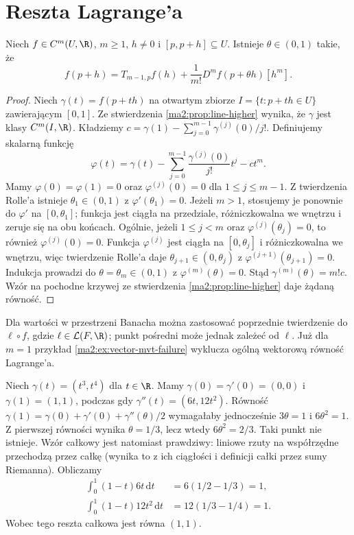 \section{Reszta Lagrange'a}
\begin{twierdzenie}
\label{ma2:thm:taylor-lagrange}
Niech $f\in C^m(U,\R)$, $m\ge1$, $h\ne0$ i
$[p,p+h]\subseteq U$. Istnieje $\theta\in(0,1)$ takie, że
\[
 f(p+h)=T_{m-1,p}f(h)+\frac{1}{m!}
                         D^mf(p+\theta h)[h^m].
\]
\end{twierdzenie}
\begin{proof}
Niech $\gamma(t)=f(p+th)$ na otwartym zbiorze
$I=\{t:p+th\in U\}$ zawierającym $[0,1]$.
Ze stwierdzenia \ref{ma2:prop:line-higher} wynika,
że $\gamma$ jest klasy $C^m(I,\R)$. Kładziemy
$c=\gamma(1)-\sum_{j=0}^{m-1}\gamma^{(j)}(0)/j!$.
Definiujemy skalarną funkcję
\[
 \varphi(t)=\gamma(t)-\sum_{j=0}^{m-1}
             \frac{\gamma^{(j)}(0)}{j!}t^j-ct^m.
\]
Mamy $\varphi(0)=\varphi(1)=0$ oraz
$\varphi^{(j)}(0)=0$ dla $1\le j\le m-1$.
Z twierdzenia Rolle'a istnieje $\theta_1\in(0,1)$
z $\varphi'(\theta_1)=0$.
Jeżeli $m>1$, stosujemy je ponownie do $\varphi'$
na $[0,\theta_1]$; funkcja jest ciągła na przedziale,
różniczkowalna we wnętrzu i zeruje się na obu końcach.
Ogólnie, jeżeli $1\le j<m$ oraz
$\varphi^{(j)}(\theta_j)=0$, to również
$\varphi^{(j)}(0)=0$. Funkcja $\varphi^{(j)}$
jest ciągła na $[0,\theta_j]$ i różniczkowalna
we wnętrzu, więc twierdzenie Rolle'a daje
$\theta_{j+1}\in(0,\theta_j)$ z
$\varphi^{(j+1)}(\theta_{j+1})=0$.
Indukcja prowadzi do $\theta=\theta_m\in(0,1)$
z $\varphi^{(m)}(\theta)=0$.
Stąd $\gamma^{(m)}(\theta)=m!c$. Wzór na pochodne
krzywej ze stwierdzenia \ref{ma2:prop:line-higher}
daje żądaną równość.
\end{proof}
\begin{uwaga}
Dla wartości w przestrzeni Banacha można zastosować
poprzednie twierdzenie do $\ell\circ f$, gdzie
$\ell\in\mathcal L(F,\R)$; punkt pośredni może jednak
zależeć od $\ell$. Już dla $m=1$ przykład
\ref{ma2:ex:vector-mvt-failure} wyklucza ogólną
wektorową równość Lagrange'a.
\end{uwaga}
\begin{przyklad}[Brak wspólnego punktu pośredniego także dla $m=2$]
\label{ma2:ex:taylor-vector-lagrange}
Niech $\gamma(t)=(t^3,t^4)$ dla $t\in\R$.
Mamy $\gamma(0)=\gamma'(0)=(0,0)$ i
$\gamma(1)=(1,1)$, podczas gdy $\gamma''(t)=(6t,12t^2)$.
Równość $\gamma(1)=\gamma(0)+\gamma'(0)+
\gamma''(\theta)/2$ wymagałaby jednocześnie
$3\theta=1$ i $6\theta^2=1$. Z pierwszej równości
wynika $\theta=1/3$, lecz wtedy $6\theta^2=2/3$.
Taki punkt nie istnieje. Wzór całkowy jest natomiast
prawdziwy: liniowe rzuty na współrzędne przechodzą
przez całkę (wynika to z ich ciągłości i definicji
całki przez sumy Riemanna). Obliczamy
\[
\begin{aligned}
 \int_0^1(1-t)6t\,\mathrm dt &=6(1/2-1/3)=1,\\
 \int_0^1(1-t)12t^2\,\mathrm dt&=12(1/3-1/4)=1.
\end{aligned}
\]
Wobec tego reszta całkowa jest równa $(1,1)$.
\end{przyklad}

